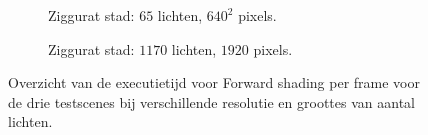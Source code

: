 \begin{figure}[t]
\begin{adjustbox}{minipage=\textwidth, scale=0.6}
\begin{subfigure}[b]{0.83\textwidth}
      \caption{Ziggurat stad: $65$ lichten, $640^2$ pixels.}
      \label{fig:ts-frames-forward:city-low}
    \end{subfigure}
  \end{adjustbox} %
  \begin{adjustbox}{minipage=\textwidth, scale=0.6}
    \begin{subfigure}[b]{0.83\textwidth}
      \centering
      \def\svgwidth{\textwidth}
      
      \caption{Ziggurat stad: $1170$ lichten, $1920$ pixels.}
      \label{fig:ts-frames-forward:city-high}
    \end{subfigure}
  \end{adjustbox}
  \caption{Overzicht van de executietijd voor Forward shading per frame voor de
           drie testscenes bij verschillende resolutie en groottes van aantal
           lichten.}
  \label{fig:ts-frames-forward}
\end{figure}


